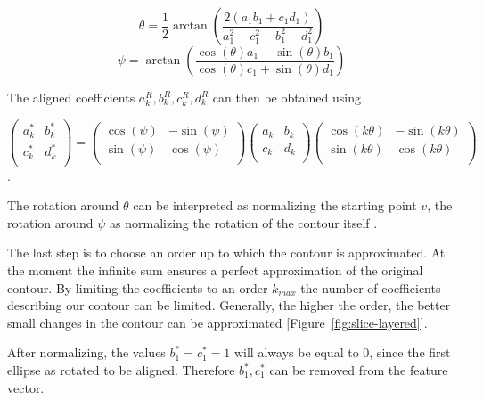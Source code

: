 $$
\theta = \frac{1}{2}\arctan \left( \frac{2(a_1b_1 + c_1d_1)}{a_1^2 + c_1^2 - b_1^2 - d_1^2} \right)
$$
$$
\psi = \arctan \left( \frac{\cos(\theta) a_1 + \sin(\theta) b_1 }{\cos(\theta) c_1 + \sin(\theta) d_1} \right)
$$

The aligned coefficients $a_k^R, b_k^R, c_k^R, d_k^R$ can then be obtained using

$$
\begin{pmatrix}
  a_k^* & b_k^* \\
  c_k^* & d_k^* \\
\end{pmatrix}
=
\begin{pmatrix}
  \cos(\psi) & -\sin(\psi) \\
  \sin(\psi) & \cos(\psi) \\
\end{pmatrix}
\begin{pmatrix}
  a_k & b_k \\
  c_k & d_k \\
\end{pmatrix}
\begin{pmatrix}
  \cos(k\theta ) & -\sin(k\theta) \\
  \sin(k\theta) & \cos(k\theta) \\
\end{pmatrix}
$$.

The rotation around $\theta $ can be interpreted as normalizing the starting point $v$, 
the rotation around $\psi$ as normalizing the rotation of the contour itself \cite{KUHL1982236}.

The last step is to choose an order up to which the contour is approximated.
At the moment the infinite sum ensures a perfect approximation of the original contour. 
By limiting the coefficients to an order $k_{max}$ the number of coefficients describing our contour can be limited.
Generally, the higher the order, the better small changes in the contour can be approximated [Figure~\ref{fig:slice-layered}].


After normalizing, the values $b_1^* = c_1^* = 1$ will always be equal to 0, since the first ellipse as rotated to be aligned.
Therefore $b_1^*, c_1^*$ can be removed from the feature vector.

